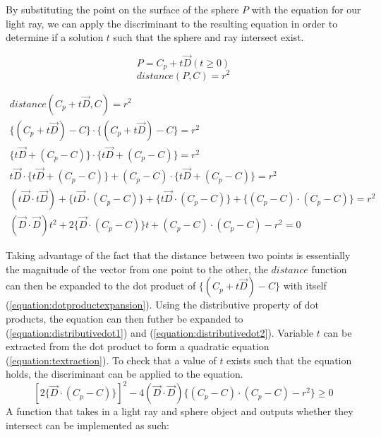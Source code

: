 \documentclass[a4paper]{article}
\newenvironment{code}{\captionsetup{type=listing}}{}
\begin{document}
By substituting the point on the surface of the sphere $P$ with the equation for our light ray, we can apply the discriminant to the resulting equation in order to determine if a solution $t$ such that the sphere and ray intersect exist.

\[
P = C_{p} + t\vec{D} (t \geq 0)
\]
\[
distance(P, C) = r^{2}
\]

\begin{align}
    distance(C_{p} + t\vec{D}, C) = r^{2} \\
    \{(C_{p} + t\vec{D}) - C\} \cdot \{(C_{p} + t\vec{D}) - C\} = r^{2}\label{equation:dotproductexpansion} \\
    \{t\vec{D} + (C_{p} - C)\} \cdot \{t\vec{D} + (C_{p} - C)\} = r^{2} \\
    t\vec{D} \cdot \{t\vec{D} + (C_{p} - C)\} + (C_{p} - C) \cdot \{t\vec{D} + (C_{p} - C)\} = r^{2}\label{equation:distributivedot1} \\
    (t\vec{D} \cdot t\vec{D}) + \{t\vec{D} \cdot (C_{p} - C)\} + \{t\vec{D} \cdot (C_{p} - C)\} + \{(C_{p} - C) \cdot (C_{p} - C)\} = r^{2}\label{equation:distributivedot2} \\
    (\vec{D} \cdot \vec{D})t^{2} + 2\{\vec{D} \cdot (C_{p} - C)\}t + (C_{p} - C) \cdot (C_{p} - C) - r^{2} = 0\label{equation:textraction}
\end{align}

Taking advantage of the fact that the distance between two points is essentially the magnitude of the vector from one point to the other, the $distance$ function can then be expanded to the dot product of $\{(C_{p} + t\vec{D}) - C\}$ with itself (\ref{equation:dotproductexpansion}). Using the distributive property of dot products, the equation can then futher be expanded to (\ref{equation:distributivedot1}) and (\ref{equation:distributivedot2}). Variable $t$ can be extracted from the dot product to form a quadratic equation (\ref{equation:textraction}). To check that a value of $t$ exists such that the equation holds, the discriminant can be applied to the equation.
\[
{[2\{\vec{D} \cdot (C_{p} - C)\}]}^{2} - 4(\vec{D} \cdot \vec{D})\{(C_{p} - C) \cdot (C_{p} - C) - r^{2}\} \geq 0
\]
A function that takes in a light ray and sphere object and outputs whether they intersect can be implemented as such:

\begin{code}
\inputminted[breaklines]{cpp}{sphere.hpp}
\end{code}

\begin{code}
\inputminted[breaklines]{cpp}{rayIntersectWithSphere.cpp}
\end{code}
\end{document}
